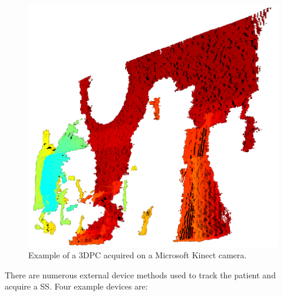                 \begin{figure}
                    \centering
                    
                    \includegraphics[width=1.0\linewidth]{figures/background_3dpc_example.png}
                    
                    \captionsetup{singlelinecheck=false, justification=raggedright}
                    \caption{Example of a \gls{3DPC} acquired on a Microsoft Kinect camera.}
                    \label{fig:external_devices_3dpc_example}
                \end{figure}
                
                There are numerous external device methods used to track the patient and acquire a \gls{SS}.  Four example devices are:
                
